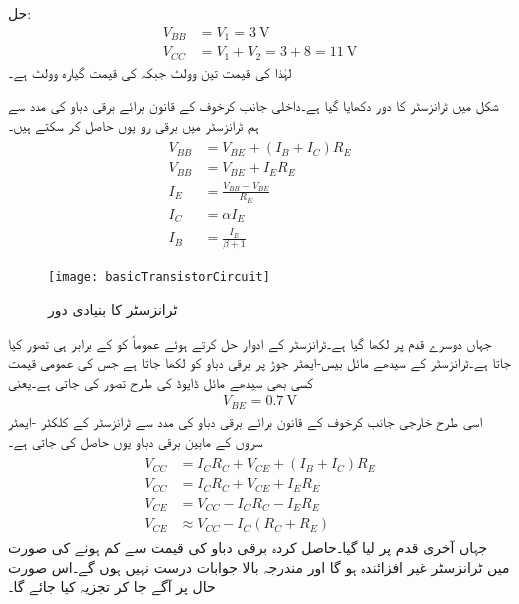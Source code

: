 حل:
\begin{align}
V_{BB}&=V_1=\SI{3}{\volt}\\
V_{CC}&=V_1+V_2=3+8=\SI{11}{\volt}
\end{align}	
لہٰذا  کی قیمت تین وولٹ جبکہ  کی قیمت گیارہ وولٹ ہے۔



شکل  میں ٹرانزسٹر کا دور دکھایا گیا ہے۔داخلی جانب کرخوف کے قانون برائے برقی دباو کی مدد سے ہم ٹرانزسٹر میں برقی رو   یوں حاصل کر سکتے ہیں۔
\begin{gather} \label{مساوات_ٹرانزسٹر_کا_بنیادی_دور_داخلی_جانب}
\begin{aligned}
V_{BB} &=V_{BE} +(I_B+I_C) R_E\\
V_{BB}&=V_{BE}+I_E R_E\\
I_E& =\frac{V_{BB}-V_{BE}}{R_E}\\
I_C&=\alpha I_E \\
I_B&=\frac{I_E}{\beta+1}
\end{aligned}
\end{gather}
%
\begin{figure}
\centering
\texttt{[image: basicTransistorCircuit]}
\caption{ٹرانزسٹر کا بنیادی دور}
\label{شکل_ٹرانزسٹر_کا_بنیادی_دور}
\end{figure}
جہاں دوسرے قدم پر  لکھا گیا ہے۔ٹرانزسٹر کے ادوار حل کرتے ہوئے عموماً  کو  کے برابر ہی تصور کیا جاتا ہے۔ٹرانزسٹر کے سیدھے مائل بیس-ایمٹر  جوڑ پر برقی دباو کو   لکھا جاتا ہے جس کی عمومی قیمت کسی بھی سیدھے مائل ڈایوڈ کی طرح   تصور کی جاتی ہے۔یعنی
\begin{align}
V_{BE}=\SI{0.7}{\volt}
\end{align}
اسی طرح خارجی جانب کرخوف کے قانون برائے برقی دباو کی مدد سے ٹرانزسٹر کے کلکٹر -ایمٹر سروں کے مابین برقی دباو  یوں حاصل کی جاتی ہے۔
\begin{gather} \label{مساوات_ٹرانزسٹر_کا_بنیادی_دور_خارجی_جانب}
\begin{aligned}
V_{CC}&=I_C R_C + V_{CE}+(I_B+I_C)R_E\\
V_{CC}&=I_C R_C + V_{CE}+I_E R_E\\
V_{CE}&=V_{CC}-I_C R_C  - I_E R_E\\
V_{CE} & \approx V_{CC}-I_C(R_C+R_E)
\end{aligned}
\end{gather}
جہاں آخری قدم پر  لیا گیا۔حاصل کردہ برقی دباو  کی قیمت  سے کم ہونے کی صورت میں ٹرانزسٹر غیر افزائندہ ہو گا اور مندرجہ بالا جوابات درست نہیں ہوں گے۔اس صورت حال پر آگے جا کر تجزیہ کیا جائے گا۔


